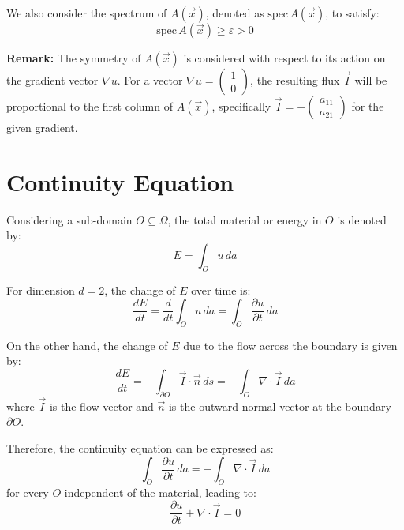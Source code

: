 \documentclass[11pt]{article}
\begin{document}
We also consider the spectrum of \( A(\vec{x}) \), denoted as \( \text{spec} \, A(\vec{x}) \), to satisfy:
\[ \text{spec} \, A(\vec{x}) \geq \varepsilon > 0 \]

\textbf{Remark:}
The symmetry of \( A(\vec{x}) \) is considered with respect to its action on the gradient vector \( \nabla u \). For a vector \( \nabla u = \begin{pmatrix} 1 \\ 0 \end{pmatrix} \), the resulting flux \( \vec{I} \) will be proportional to the first column of \( A(\vec{x}) \), specifically \( \vec{I} = - \begin{pmatrix} a_{11} \\ a_{21} \end{pmatrix} \) for the given gradient.


\section*{Continuity Equation}

Considering a sub-domain \( O \subseteq \Omega \), the total material or energy in \( O \) is denoted by:
\[ E = \int_O u \, da \]

For dimension \( d = 2 \), the change of \( E \) over time is:
\[ \frac{dE}{dt} = \frac{d}{dt} \int_O u \, da = \int_O \frac{\partial u}{\partial t} \, da \]

On the other hand, the change of \( E \) due to the flow across the boundary is given by:
\[ \frac{dE}{dt} = -\int_{\partial O} \vec{I} \cdot \vec{n} \, ds = -\int_O \nabla \cdot \vec{I} \, da \]
where \( \vec{I} \) is the flow vector and \( \vec{n} \) is the outward normal vector at the boundary \( \partial O \).

Therefore, the continuity equation can be expressed as:
\[ \int_O \frac{\partial u}{\partial t} \, da = -\int_O \nabla \cdot \vec{I} \, da \]
for every \( O \) independent of the material, leading to:
\[ \frac{\partial u}{\partial t} + \nabla \cdot \vec{I} = 0 \]
\end{document}
